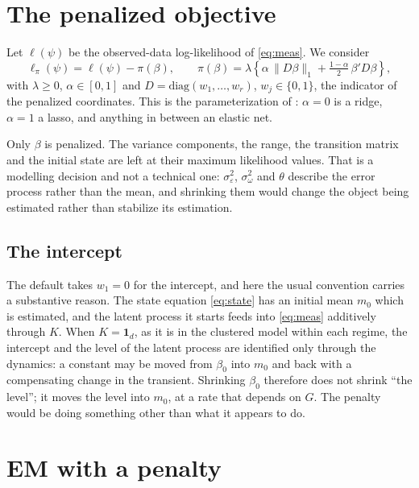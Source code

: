 \documentclass[11pt,a4paper]{article}
\begin{document}
\section{The penalized objective}

Let $\ell(\psi)$ be the observed-data log-likelihood of \eqref{eq:meas}. We
consider
\begin{equation}
  \ell_\pi(\psi) = \ell(\psi) - \pi(\beta),
  \qquad
  \pi(\beta) = \lambda\left\{
    \alpha\,\lVert D\beta\rVert_1
    + \tfrac{1-\alpha}{2}\,\beta'D\beta \right\},
  \label{eq:pen}
\end{equation}
with $\lambda \ge 0$, $\alpha\in[0,1]$ and $D = \mathrm{diag}(w_1,\dots,w_r)$,
$w_j\in\{0,1\}$, the indicator of the penalized coordinates. This is the
parameterization of \citet{ZouHastie2005}: $\alpha=0$ is a ridge, $\alpha=1$ a
lasso, and anything in between an elastic net.

Only $\beta$ is penalized. The variance components, the range, the transition
matrix and the initial state are left at their maximum likelihood values. That
is a modelling decision and not a technical one: $\sigma^2_\varepsilon$,
$\sigma^2_\omega$ and $\theta$ describe the error process rather than the mean,
and shrinking them would change the object being estimated rather than
stabilize its estimation.

\subsection{The intercept}

The default takes $w_1 = 0$ for the intercept, and here the usual convention
carries a substantive reason. The state equation \eqref{eq:state} has an
initial mean $m_0$ which is estimated, and the latent process it starts feeds
into \eqref{eq:meas} additively through $K$. When $K = \mathbf{1}_d$, as it is
in the clustered model within each regime, the intercept and the level of the
latent process are identified only through the dynamics: a constant may be moved
from $\beta_0$ into $m_0$ and back with a compensating change in the transient.
Shrinking $\beta_0$ therefore does not shrink ``the level''; it moves the level
into $m_0$, at a rate that depends on $G$. The penalty would be doing something
other than what it appears to do.

\section{EM with a penalty}
\end{document}
